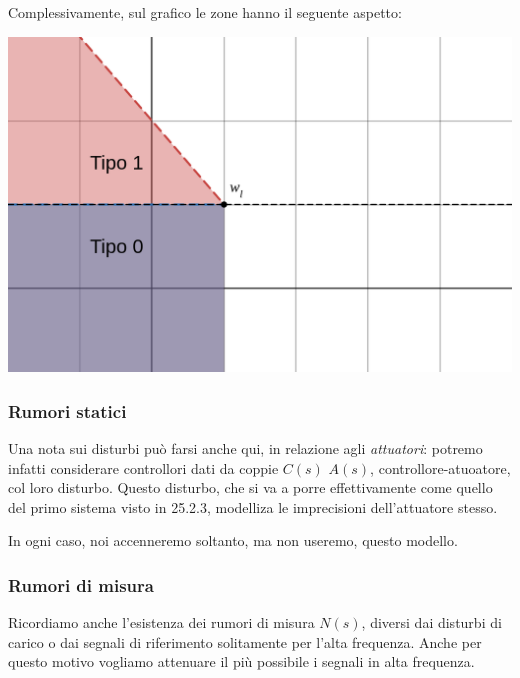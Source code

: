 \documentclass[a4paper,11pt]{article}
\begin{document}
\noindent
\begin{minipage}{\textwidth}

	Complessivamente, sul grafico le zone hanno il seguente aspetto:
	\begin{center}
		\includegraphics[scale=0.28]{../figures/loop_shaping_lower.png}
	\end{center}

\end{minipage}

\subsubsection{Rumori statici}
Una nota sui disturbi può farsi anche qui, in relazione agli \textit{attuatori}: potremo infatti considerare controllori dati da coppie $C(s)$ $A(s)$, controllore-atuoatore, col loro disturbo.
Questo disturbo, che si va a porre effettivamente come quello del primo sistema visto in 25.2.3, modelliza le imprecisioni dell'attuatore stesso.

In ogni caso, noi accenneremo soltanto, ma non useremo, questo modello.

\subsubsection{Rumori di misura}
Ricordiamo anche l'esistenza dei rumori di misura $N(s)$, diversi dai disturbi di carico o dai segnali di riferimento solitamente per l'alta frequenza.
Anche per questo motivo vogliamo attenuare il più possibile i segnali in alta frequenza.
\end{document}
